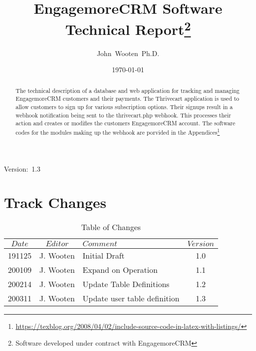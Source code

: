 \documentclass[final,letterpaper,12pt]{article}
\author{John~Wooten~Ph.D.\\
}
\date{\today \\
}
\title{EngagemoreCRM Software Technical Report\thanks{Software developed under contract with EngagemoreCRM}}
\begin{document}
\maketitle
\begin{center}
Version:~1.3
\end{center}

\begin {abstract}
\noindent The technical description of a database and web application
for tracking and managing EngagemoreCRM customers and their payments.
The Thrivecart application is used to allow customers to sign up for various
subscription options.  Their signups result in a webhook notification being sent to
the thrivecart.php webhook.  This processes their action and creates or modifies
the customers EngagemoreCRM account.  The software codes for the modules making up the webhook are porvided in the Appendices\footnote{\url{https://texblog.org/2008/04/02/include-source-code-in-latex-with-listings/}}
\end{abstract}
\newpage
\tableofcontents
\newpage
\listoffigures
\listoftables

\newpage
\section{Track Changes}
\begin{table}[h]
\begin{center}
\begin{tabular}{|c|c|l|c|} \hline
$ Date $ & $Editor$ & $Comment$ & $Version$ \\
\hline
191125 & J. Wooten & Initial Draft & 1.0  \\
200109 & J. Wooten & Expand on Operation & 1.1 \\
200214 & J. Wooten & Update Table Definitions & 1.2 \\
200311 & J. Wooten & Update user table definition & 1.3 \\

\hline
\end{tabular}
\end{center}
\caption {Table of Changes}
\label{tab:cqdata0}
\end{table}

\newpage
\end{document}
